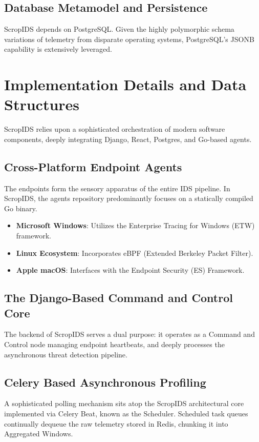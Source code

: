 \documentclass[10pt, conference]{IEEEtran}
\begin{document}
\subsection{Database Metamodel and Persistence}
ScropIDS depends on PostgreSQL. Given the highly polymorphic schema variations of telemetry from disparate operating systems, PostgreSQL's JSONB capability is extensively leveraged.

\section{Implementation Details and Data Structures}
ScropIDS relies upon a sophisticated orchestration of modern software components, deeply integrating Django, React, Postgres, and Go-based agents.

\subsection{Cross-Platform Endpoint Agents}
The endpoints form the sensory apparatus of the entire IDS pipeline. In ScropIDS, the agents repository predominantly focuses on a statically compiled Go binary.
\begin{itemize}
    \item \textbf{Microsoft Windows}: Utilizes the Enterprise Tracing for Windows (ETW) framework.
    \item \textbf{Linux Ecosystem}: Incorporates eBPF (Extended Berkeley Packet Filter).
    \item \textbf{Apple macOS}: Interfaces with the Endpoint Security (ES) Framework.
\end{itemize}

\subsection{The Django-Based Command and Control Core}
The backend of ScropIDS serves a dual purpose: it operates as a Command and Control node managing endpoint heartbeats, and deeply processes the asynchronous threat detection pipeline.

\subsection{Celery Based Asynchronous Profiling}
A sophisticated polling mechanism sits atop the ScropIDS architectural core implemented via Celery Beat, known as the Scheduler. Scheduled task queues continually dequeue the raw telemetry stored in Redis, chunking it into Aggregated Windows.
\end{document}
